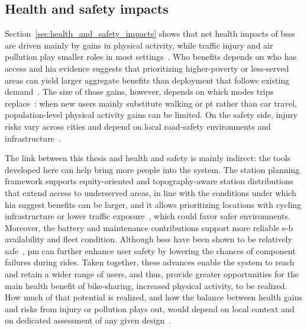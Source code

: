 \subsection{Health and safety impacts}

Section~\ref{sec:health_and_safety_impacts} shows that net health impacts of \acp{bss} are driven mainly by gains in physical activity, while traffic injury and air pollution play smaller roles in most settings~\cite{Rojas-Rueda2011, Woodcock2014, Otero2018, Teixeira2021}. Who benefits depends on who has access and \ac{hia} evidence suggests that prioritizing higher-poverty or less-served areas can yield larger aggregate benefits than deployment that follows existing demand~\cite{Babagoli2019, Clockston2021}. The size of those gains, however, depends on which modes trips replace~\cite{Fishman2014, Murphy2015, Bauman2017}: when new users mainly substitute walking or \ac{pt} rather than car travel, population-level physical activity gains can be limited. On the safety side, injury risks vary across cities and depend on local road-safety environments and infrastructure~\cite{Rojas-Rueda2011, Woodcock2014, Otero2018, Clockston2021}.

The link between this thesis and health and safety is mainly indirect: the tools developed here can help bring more people into the system. The station planning framework supports equity-oriented and topography-aware station distributions that extend access to underserved areas, in line with the conditions under which \ac{hia} suggest benefits can be larger, and it allows prioritizing locations with cycling infrastructure or lower traffic exposure~\cite{Goodman2014, Garrard2012}, which could favor safer environments. Moreover, the battery and maintenance contributions support more reliable \ac{e-b} availability and fleet condition. Although \acp{bss} have been shown to be relatively safe~\cite{Woodcock2014, Martin2016, Fishman2016_road_safety, Jacobsen2015, Teixeira2021}, \ac{pm} can further enhance user safety by lowering the chances of component failures during rides. Taken together, these advances enable the system to reach and retain a wider range of users, and thus, provide greater opportunities for the main health benefit of bike-sharing, increased physical activity, to be realized. How much of that potential is realized, and how the balance between health gains and risks from injury or pollution plays out, would depend on local context and on dedicated assessment of any given design~\cite{Teixeira2021, Chen2023}.


